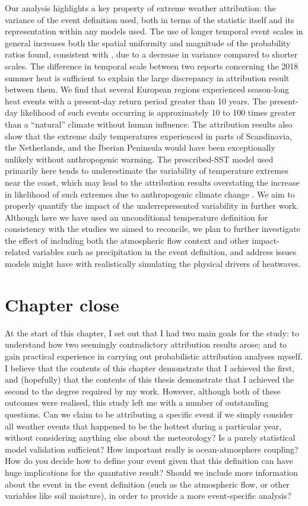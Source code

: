   Our analysis highlights a key property of extreme weather attribution: the variance of the event definition used, both in terms of the statistic itself and its representation within any models used. The use of longer temporal event scales in general increases both the spatial uniformity and magnitude of the probability ratios found, consistent with \citet{kirchmeieryoung_importance_2019}, due to a decrease in variance compared to shorter scales. The difference in temporal scale between two reports concerning the 2018 summer heat is sufficient to explain the large discrepancy in attribution result between them. We find that several European regions experienced season-long heat events with a present-day return period greater than 10 years. The present-day likelihood of such events occurring is approximately 10 to 100 times greater than a ``natural'' climate without human influence. The attribution results also show that the extreme daily temperatures experienced in parts of Scandinavia, the Netherlands, and the Iberian Peninsula would have been exceptionally unlikely without anthropogenic warming. The prescribed-SST model used primarily here tends to underestimate the variability of temperature extremes near the coast, which may lead to the attribution results overstating the increase in likelihood of such extremes due to anthropogenic climate change \citep{bellprat_towards_2019}. We aim to properly quantify the impact of the underrepresented variability in further work. Although here we have used an unconditional temperature definition for consistency with the studies we aimed to reconcile, we plan to further investigate the effect of including both the atmospheric flow context and other impact-related variables such as precipitation in the event definition, and address issues models might have with realistically simulating the physical drivers of heatwaves.

\section{Chapter close}

  At the start of this chapter, I set out that I had two main goals for the study: to understand how two seemingly contradictory attribution results arose; and to gain practical experience in carrying out probabilistic attribution analyses myself. I believe that the contents of this chapter demonstrate that I achieved the first, and (hopefully) that the contents of this thesis demonstrate that I achieved the second to the degree required by my work. However, although both of these outcomes were realised, this study left me with a number of outstanding questions. Can we claim to be attributing a specific event if we simply consider all weather events that happened to be the hottest during a particular year, without considering anything else about the meteorology? Is a purely statistical model validation sufficient? How important really is ocean-atmosphere coupling? How do you decide how to define your event given that this definition can have huge implications for the quantative result? Should we include more information about the event in the event definition (such as the atmospheric flow, or other variables like soil moisture), in order to provide a more event-specific analysis? 

